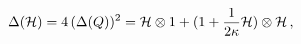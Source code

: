 \begin{equation}\label{boro3.7}
\Delta({\cal H})=4\,(\Delta(Q))^2={\cal H}\otimes1 +
(1+\frac{1}{2\kappa}{\cal H})\otimes{\cal H}\,,
\end{equation}

